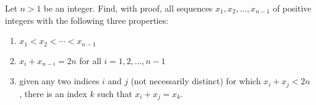 Let $n>1$ be an integer. Find, with proof, all sequences $x_1,x_2,\ldots,x_{n-1}$ of positive integers with the following three properties:
\begin{enumerate}[label=(\alph*)]
	\item $x_1<x_2<\cdots<x_{n-1}$
	\item $x_i+x_{n-i}=2n$ for all $i=1,2,\ldots,n-1$
	\item given any two indices $i$ and $j$ (not necessarily distinct) for which $x_i+x_j<2n$, there is an index $k$ such that $x_i+x_j=x_k$.
\end{enumerate}